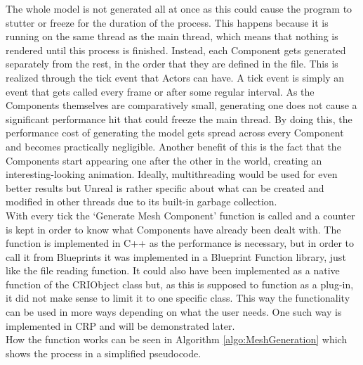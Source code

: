 The whole model is not generated all at once as this could cause the program to stutter or freeze for the duration of the process. This happens because it is running on the same thread as the main thread, which means that nothing is rendered until this process is finished. Instead, each Component gets generated separately from the rest, in the order that they are defined in the file. This is realized through the tick event that Actors can have. A tick event is simply an event that gets called every frame or after some regular interval. As the Components themselves are comparatively small, generating one does not cause a significant performance hit that could freeze the main thread. By doing this, the performance cost of generating the model gets spread across every Component and becomes practically negligible. Another benefit of this is the fact that the Components start appearing one after the other in the world, creating an interesting-looking animation. Ideally, multithreading would be used for even better results but Unreal is rather specific about what can be created and modified in other threads due to its built-in garbage collection\cite{bib:MultiThread}.\\
With every tick the `Generate Mesh Component' function is called and a counter is kept in order to know what Components have already been dealt with. The function is implemented in C++ as the performance is necessary, but in order to call it from Blueprints it was implemented in a Blueprint Function library, just like the file reading function. It could also have been implemented as a native function of the CRIObject class but, as this is supposed to function as a plug-in, it did not make sense to limit it to one specific class. This way the functionality can be used in more ways depending on what the user needs. One such way is implemented in \acs{CRP} and will be demonstrated later.\\
How the function works can be seen in Algorithm \ref{algo:MeshGeneration} which shows the process in a simplified pseudocode.

